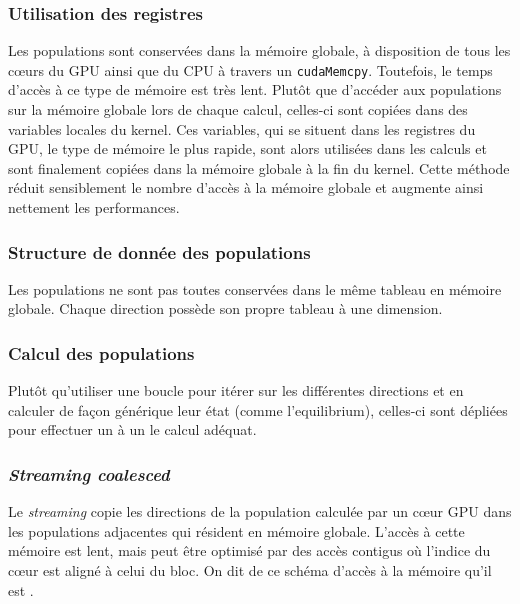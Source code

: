 \subsubsection{Utilisation des registres}
Les populations sont conservées dans la mémoire globale, à disposition de tous les cœurs du \acs{GPU} ainsi que du \acs{CPU} à travers un \texttt{cudaMemcpy}. Toutefois, le temps d'accès à ce type de mémoire est très lent. Plutôt que d'accéder aux populations sur la mémoire globale lors de chaque calcul, celles-ci sont copiées dans des variables locales du kernel. Ces variables, qui se situent dans les registres du \acs{GPU}, le type de mémoire le plus rapide, sont alors utilisées dans les calculs et sont finalement copiées dans la mémoire globale à la fin du kernel.
Cette méthode réduit sensiblement le nombre d'accès à la mémoire globale et augmente ainsi nettement les performances.
\subsubsection{Structure de donnée des populations}
Les populations ne sont pas toutes conservées dans le même tableau en mémoire globale. Chaque direction possède son propre tableau à une dimension.

\subsubsection{Calcul des populations}
Plutôt qu'utiliser une boucle pour itérer sur les différentes directions et en calculer de façon générique leur état (comme l'equilibrium), celles-ci sont dépliées pour effectuer un à un le calcul adéquat.

\subsubsection{\textit{Streaming coalesced}}\label{title-streaming-coalesced}
Le \textit{streaming} copie les directions de la population calculée par un cœur \acs{GPU} dans les populations adjacentes qui résident en mémoire globale. L'accès à cette mémoire est lent, mais peut être optimisé par des accès contigus où l'indice du cœur est aligné à celui du bloc. On dit de ce schéma d'accès à la mémoire qu'il est .

